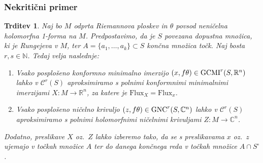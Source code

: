 \documentclass[12pt,a4paper,twoside]{article}
\theoremstyle{definition} %
\theoremstyle{plain} %
\newtheorem{trditev}[definicija]{Trditev}
\numberwithin{equation}{section}  %
\newcommand{\R}{\mathbb R}
\newcommand{\N}{\mathbb N}
\newcommand{\C}{\mathbb C}
\begin{document}
\subsubsection{Nekritični primer}
%
\begin{trditev} \label{trd:nekritcni-primer}
Naj bo $M$ odprta Riemannova ploskev in $\theta$ povsod neničelna holomorfna 1-forma na $M$.
Predpostavimo, da je $S$ povezana dopustna množica, ki je Rungejeva v $M$, ter $A=\{a_{1}, \dots , a_{k} \} \subset S$ končna množica točk. Naj bosta $r, s \in \N$. Tedaj velja naslednje:
\begin{enumerate}
\item 
Vsako posplošeno konformno minimalno imerzijo $(x, f\theta) \in \textup{GCMI}^{r}(S,\R^{n})$ lahko v $\mathcal{C}^{r}(S)$ aproksimiramo s polnimi konformnimi minimalnimi imerzijami $X \colon M \to \R^{n}$, za katere je $\text{Flux}_{X} = \text{Flux}_{x}$. 
\item
Vsako posplošeno ničelno krivuljo $(z, f\theta) \in \textup{GNC}^{r}(S,\C^{n})$ lahko v $\mathcal{C}^{r}(S)$ aproksimiramo s polnimi holomorfnimi ničelnimi krivuljami $Z \colon M \to \C^{n}$.
\end{enumerate}
Dodatno, preslikave $X$ oz.~$Z$ lahko izberemo tako, da se s preslikavama $x$ oz.~$z$ ujemajo v točkah množice $A$ ter do danega končnega reda v točkah množice $A \cap S^{\circ}$.
\end{trditev}
\end{document}
